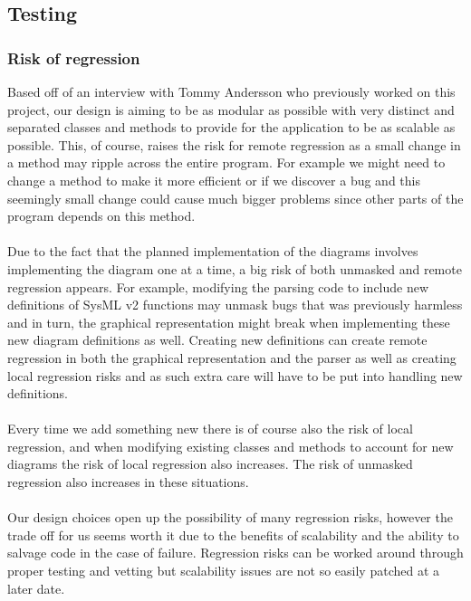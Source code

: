 \documentclass{article}
\begin{document}
\subsection{Testing}


\subsubsection{Risk of regression}

Based off of an interview with Tommy Andersson who previously worked on this project, our design is aiming to be as modular as possible with very distinct and separated classes and methods to provide for the application to be as scalable as possible. This, of course, raises the risk for remote regression as a small change in a method may ripple across the entire program. For example we might need to change a method to make it more efficient or if we discover a bug and this seemingly small change could cause much bigger problems since other parts of the program depends on this method. 
\\\\
Due to the fact that the planned implementation of the diagrams involves implementing the diagram one at a time, a big risk of both unmasked and remote regression appears. For example, modifying the parsing code  to include new definitions of SysML v2 functions may unmask bugs that was previously harmless and in turn, the graphical representation might break when implementing these new diagram definitions as well. Creating new definitions can create remote regression in both the graphical representation and the parser as well as creating local regression risks and as such extra care will have to be put into handling new definitions.
\\\\
Every time we add something new there is of course also the risk of local regression, and when modifying existing classes and methods to account for new diagrams the risk of local regression also increases. The risk of unmasked regression also increases in these situations.
\\\\
Our design choices open up the possibility of many regression risks, however the trade off for us seems worth it due to the benefits of scalability and the ability to salvage code in the case of failure. Regression risks can be worked around through proper testing and vetting but scalability issues are not so easily patched at a later date.
\end{document}

